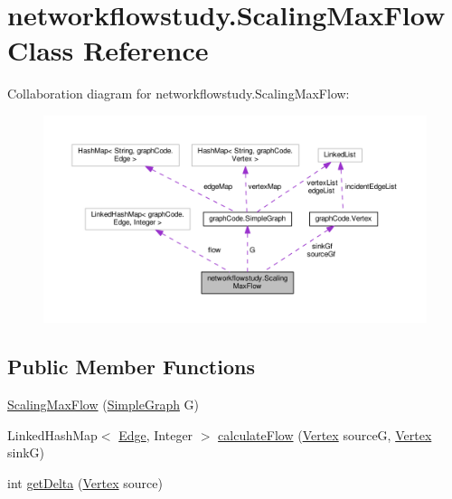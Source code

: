 \hypertarget{classnetworkflowstudy_1_1ScalingMaxFlow}{}\section{networkflowstudy.\+Scaling\+Max\+Flow Class Reference}
\label{classnetworkflowstudy_1_1ScalingMaxFlow}


Collaboration diagram for networkflowstudy.\+Scaling\+Max\+Flow\+:\nopagebreak
\begin{figure}[H]
\begin{center}
\leavevmode
\includegraphics[width=350pt]{classnetworkflowstudy_1_1ScalingMaxFlow__coll__graph}
\end{center}
\end{figure}
\subsection*{Public Member Functions}
\begin{DoxyCompactItemize}
\item 
\hyperlink{classnetworkflowstudy_1_1ScalingMaxFlow_a5f44980b9bf6c85fc0b925c5527e3464}{Scaling\+Max\+Flow} (\hyperlink{classgraphCode_1_1SimpleGraph}{Simple\+Graph} G)
\item 
Linked\+Hash\+Map$<$ \hyperlink{classgraphCode_1_1Edge}{Edge}, Integer $>$ \hyperlink{classnetworkflowstudy_1_1ScalingMaxFlow_a14309c02ceb7dc345452eced38777696}{calculate\+Flow} (\hyperlink{classgraphCode_1_1Vertex}{Vertex} sourceG, \hyperlink{classgraphCode_1_1Vertex}{Vertex} sinkG)
\item 
int \hyperlink{classnetworkflowstudy_1_1ScalingMaxFlow_a5d2651a2301430ad246aea848eb34a91}{get\+Delta} (\hyperlink{classgraphCode_1_1Vertex}{Vertex} source)
\end{DoxyCompactItemize}


